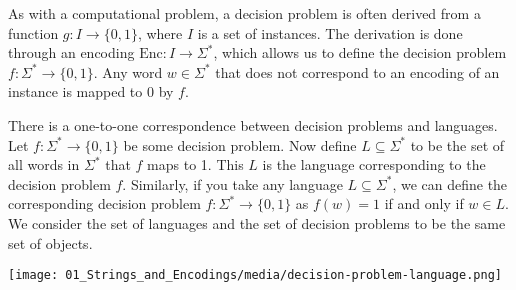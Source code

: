 \begin{note} \label{note:Decision-problem-as-mapping-instances-to-0-or-1s}
As with a computational problem, a decision problem is often derived from a function $g: I \to \{0,1\}$, where $I$ is a set of instances. 
The derivation is done through an encoding $\text{Enc}: I \to \Sigma^*$, which allows us to define the decision problem $f: \Sigma^* \to \{0,1\}$. Any word $w \in \Sigma^*$ that does not correspond to an encoding of an instance is mapped to $0$ by $f$.
\end{note}

\begin{important} \label{important:Correspondence-between-decision-problems-and-languages}
There is a one-to-one correspondence between decision problems and languages. Let $f:\Sigma^* \to \{0,1\}$ be some decision problem. Now define $L \subseteq \Sigma^*$ to be the set of all words in $\Sigma^*$ that $f$ maps to 1. This $L$ is the language corresponding to the decision problem $f$. Similarly, if you take any language $L \subseteq \Sigma^*$, we can define the corresponding decision problem $f:\Sigma^* \to \{0,1\}$ as $f(w) = 1$ if and only if $w \in L$. We consider the set of languages and the set of decision problems to be the same set of objects.
\begin{center}
    \texttt{[image: 01\_Strings\_and\_Encodings/media/decision-problem-language.png]}
\end{center}
\end{important}






